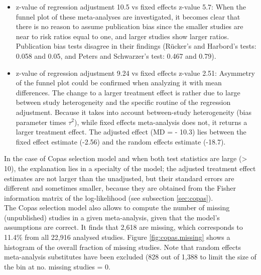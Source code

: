 \documentclass[11pt,a4paper,twoside]{book}\usepackage[]{graphicx}\usepackage[]{color}
\begin{document}
\begin{itemize}
\item z-value of regression adjustment 10.5 vs fixed effects z-value 5.7: When the funnel plot of these meta-analyses are investigated, it becomes clear that there is no reason to assume publication bias since the smaller studies are near to risk ratios equal to one, and larger studies show larger ratios. Publication bias tests disagree in their findings (R\"ucker's and Harbord's tests: 0.058 and 0.05, and Peters and Schwarzer's test: 0.467 and 0.79).
\item z-value of regression adjustment 9.24 vs fixed effects z-value 2.51: Asymmetry of the funnel plot could be confirmed when analyzing it with mean differences. The change to a larger treatment effect is rather due to large between study heterogeneity and the specific routine of the regression adjustment. Because it takes into account between-study heterogeneity (bias parameter times $\tau^2$), while fixed effects meta-analysis does not, it returns a larger treatment effect. The adjusted effect (MD = - 10.3) lies between the fixed effect estimate (-2.56) and the random effects estimate (-18.7).
\end{itemize}
In the case of Copas selection model and when both test statistics are large (> 10), the explanation lies in a specialty of the model; the adjusted treatment effect estimates are not larger than the unadjusted, but their standard errors are different and sometimes smaller, because they are obtained from the Fisher information matrix of the log-likelihood (see subsection \ref{sec:copas}). \\
The Copas selection model also allows to compute the number of missing (\ie unpublished) studies in a given meta-analysis, given that the model's assumptions are correct. It finds that 2,618 are missing, which corresponds to 11.4\% from all 22,916 analysed studies. Figure \ref{fig:copas.missing} shows a histogram of the overall fraction of missing studies. Note that random effects meta-analysis substitutes have been excluded (828 out of 1,388 to limit the size of the bin at no. missing studies = 0.
\end{document}

